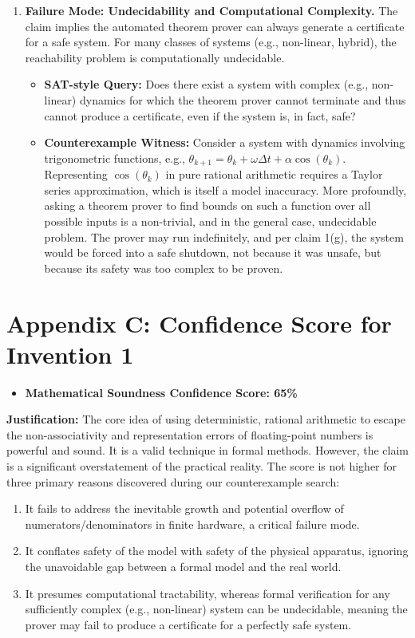 \documentclass{article}
\begin{document}
\begin{enumerate}
    \item \textbf{Failure Mode: Undecidability and Computational Complexity.}
    The claim implies the automated theorem prover can always generate a certificate for a safe system. For many classes of systems (e.g., non-linear, hybrid), the reachability problem is computationally undecidable.
     \begin{itemize}
        \item \textbf{SAT-style Query:} Does there exist a system with complex (e.g., non-linear) dynamics for which the theorem prover cannot terminate and thus cannot produce a certificate, even if the system is, in fact, safe?
        \item \textbf{Counterexample Witness:} Consider a system with dynamics involving trigonometric functions, e.g., $\theta_{k+1} = \theta_k + \omega \Delta t + \alpha \cos(\theta_k)$. Representing $\cos(\theta_k)$ in pure rational arithmetic requires a Taylor series approximation, which is itself a model inaccuracy. More profoundly, asking a theorem prover to find bounds on such a function over all possible inputs is a non-trivial, and in the general case, undecidable problem. The prover may run indefinitely, and per claim 1(g), the system would be forced into a safe shutdown, not because it was unsafe, but because its safety was too complex to be proven.
    \end{itemize}
\end{enumerate}

\section{Appendix C: Confidence Score for Invention 1}
\begin{itemize}
    \item \textbf{Mathematical Soundness Confidence Score: 65\%}
\end{itemize}
\textbf{Justification:} The core idea of using deterministic, rational arithmetic to escape the non-associativity and representation errors of floating-point numbers is powerful and sound. It is a valid technique in formal methods. However, the claim is a significant overstatement of the practical reality. The score is not higher for three primary reasons discovered during our counterexample search:
\begin{enumerate}
    \item It fails to address the inevitable growth and potential overflow of numerators/denominators in finite hardware, a critical failure mode.
    \item It conflates safety of the model with safety of the physical apparatus, ignoring the unavoidable gap between a formal model and the real world.
    \item It presumes computational tractability, whereas formal verification for any sufficiently complex (e.g., non-linear) system can be undecidable, meaning the prover may fail to produce a certificate for a perfectly safe system.
\end{enumerate}
\end{document}
